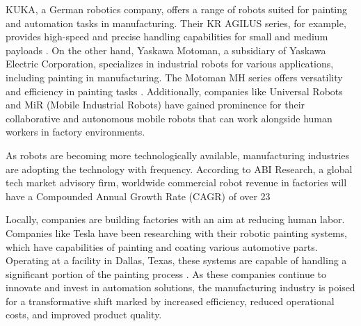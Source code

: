 KUKA, a German robotics company, offers a range of robots suited for painting and automation tasks in manufacturing. Their KR AGILUS series, for example, provides high-speed and precise handling capabilities for small and medium payloads \cite{muftooh20186}. On the other hand, Yaskawa Motoman, a subsidiary of Yaskawa Electric Corporation, specializes in industrial robots for various applications, including painting in manufacturing. The Motoman MH series offers versatility and efficiency in painting tasks \cite{muftooh20186}. Additionally, companies like Universal Robots and MiR (Mobile Industrial Robots) have gained prominence for their collaborative and autonomous mobile robots that can work alongside human workers in factory environments.

As robots are becoming more technologically available, manufacturing industries are adopting the technology with frequency. According to ABI Research, a global tech market advisory firm, worldwide commercial robot revenue in factories will have a Compounded Annual Growth Rate (CAGR) of over 23%

Locally, companies are building factories with an aim at reducing human labor. Companies like Tesla have been researching with their robotic painting systems, which have capabilities of painting and coating various automotive parts. Operating at a facility in Dallas, Texas, these systems are capable of handling a significant portion of the painting process \cite{dallasnewsBattleHumans}. As these companies continue to innovate and invest in automation solutions, the manufacturing industry is poised for a transformative shift marked by increased efficiency, reduced operational costs, and improved product quality.
